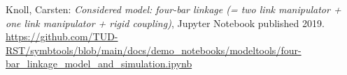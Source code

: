 \documentclass[10pt,a4paper]{article}
\begin{document}
	
	\begin{thebibliography}{10}		
		Knoll, Carsten: 
		\textit{Considered model: four-bar linkage (= two link manipulator + one link manipulator + rigid coupling)}, Jupyter Notebook published 2019. \\
		\url{https://github.com/TUD-RST/symbtools/blob/main/docs/demo_notebooks/modeltools/four-bar_linkage_model_and_simulation.ipynb}
	\end{thebibliography}
\end{document}
